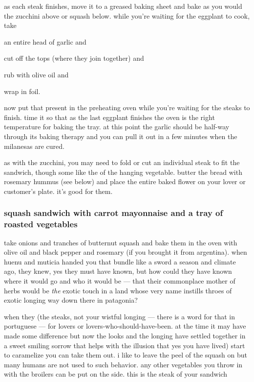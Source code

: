 as each steak finishes, move it to a greased baking sheet and bake as
you would the zucchini above or squash below. while you're waiting for
the eggplant to cook, take

\begin{algorithm}
  \item an entire head of garlic and
  \item cut off the tops (where they join together) and
  \item rub with olive oil and
  \item wrap in foil.
\end{algorithm}

now put that present in the preheating oven while you're waiting
for the steaks to finish. time it so that as the last eggplant
finishes the oven is the right temperature for baking the tray. at
this point the garlic should be half-way through its baking therapy
and you can pull it out in a few minutes when the milanesas are cured.

as with the zucchini, you may need to fold or cut an individual steak
to fit the sandwich, though some like the  of the hanging
vegetable. butter the bread with rosemary hummus (see below) and place
the entire baked flower on your lover or customer's plate. it's good
for them.

\subsubsection{squash sandwich with carrot mayonnaise and a tray of roasted vegetables}

take onions and \gls{tranches} of butternut
squash and bake them in the oven with olive oil and black pepper and
rosemary (if you brought it from argentina). when huenu and muticia
handed you that bundle like a sword a season and climate ago, they
knew, yes they must have known, but how could they have known where it
would go and who it would be --- that their commonplace mother of
herbs would be \textit{the} exotic touch in a land whose very name
instills throes of exotic longing way down there in patagonia?

when they (the steaks, not your wistful longing --- there is a word
for that in portuguese --- for lovers or lovers-who-should-have-been. at the time it may have made some difference but now the looks
and the longing have settled together in a sweet smiling sorrow that
helps with the illusion that yes you have lived) start to caramelize
you can take them out. i like to leave the peel of the squash on but
many humans are not used to such behavior. any other vegetables you
throw in with the broilers can be put on the side. this is the steak
of your sandwich

